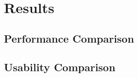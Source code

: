 
\chapter{Results} \label{chapter::results}

\section{Performance Comparison} \label{section::performance_comparison}

\section{Usability Comparison} \label{section::usability_comparison}